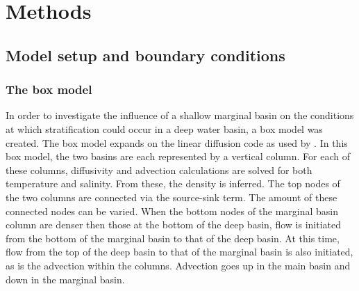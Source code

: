 \documentclass[twocolumn]{article}
\begin{document}




\section{Methods}
\subsection{Model setup and boundary conditions}
\subsubsection{The box model}
In order to investigate the influence of a shallow marginal basin on the conditions at which stratification could occur in a deep water basin, a box model was created. The box model expands on the linear diffusion code as used by \cite{Heiden2017Application}. In this box model, the two basins are each represented by a vertical column. For each of these columns, diffusivity and advection calculations are solved for both temperature and salinity. From these, the density is inferred. The top nodes of the two columns are connected via the source-sink term. The amount of these connected nodes can be varied. When the bottom nodes of the marginal basin column are denser then those at the bottom of the deep basin, flow is initiated from the bottom of the marginal basin to that of the deep basin. At this time, flow from the top of the deep basin to that of the marginal basin is also initiated, as is the advection within the columns. Advection goes up in the main basin and down in the marginal basin.
\end{document}
